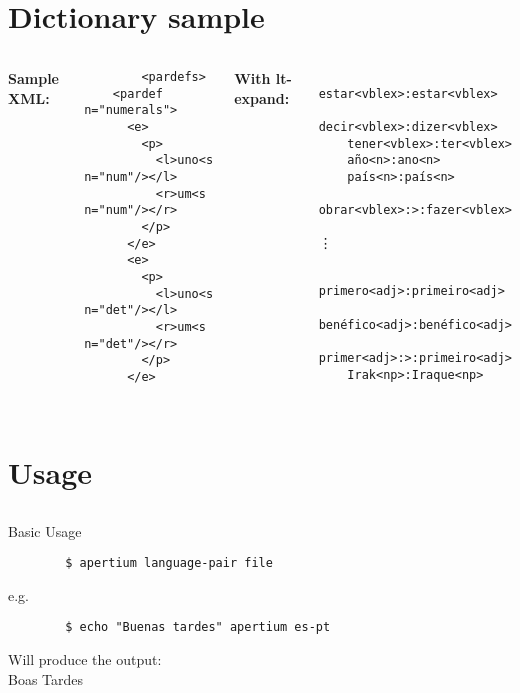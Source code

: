 \documentclass{beamer}
\begin{document}
\section{Dictionary sample}
\begin{frame}[fragile]
	\scriptsize
	\begin{columns}[t]	
	{\bf Sample XML:}
	\lstset{
		    		language=XML,
		    		basicstyle=\ttfamily\scriptsize,
		    		breaklines=true
				}
	\begin{lstlisting}
		<pardefs>
    <pardef n="numerals">
      <e>
        <p>
          <l>uno<s n="num"/></l>
          <r>um<s n="num"/></r>
        </p>
      </e>
      <e>
        <p>
          <l>uno<s n="det"/></l>
          <r>um<s n="det"/></r>
        </p>
      </e>
	\end{lstlisting}

	{\bf With lt-expand:}
	\begin{center}
	\begin{verbatim}
	estar<vblex>:estar<vblex>
	decir<vblex>:dizer<vblex>
	tener<vblex>:ter<vblex>
	año<n>:ano<n>
	país<n>:país<n>
	obrar<vblex>:>:fazer<vblex>
	\end{verbatim}
	\vdots
	\begin{verbatim}
	primero<adj>:primeiro<adj>
	benéfico<adj>:benéfico<adj>
	primer<adj>:>:primeiro<adj>
	Irak<np>:Iraque<np>
	
	\end{verbatim}
	\end{center}
	\end{columns}
\end{frame}

\section{Usage}
\subsection{}
\begin{frame}[fragile]
	
	\begin{block}{Basic Usage}	
	\lstset{
		    		language=bash,
		    		basicstyle=\ttfamily\small,
		    		breaklines=true
				}
	\begin{lstlisting}
		$ apertium language-pair file
	\end{lstlisting}
	e.g.
	\lstset{
		    		language=bash,
		    		basicstyle=\ttfamily\small,
		    		breaklines=true
				}
	\begin{lstlisting}
		$ echo "Buenas tardes" apertium es-pt
	\end{lstlisting}
	Will produce the output:\\
	Boas Tardes
	\end{block}

\end{frame}
\end{document}
